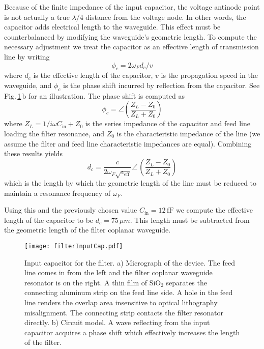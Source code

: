 Because of the finite impedance of the input capacitor, the voltage antinode point is not actually a true $\lambda/4$ distance from the voltage node.
In other words, the capacitor adds electrical length to the waveguide.
This effect must be counterbalanced by modifying the waveguide's geometric length.
To compute the necessary adjustment we treat the capacitor as an effective length of transmission line by writing \begin{equation}
\phi_c = 2 \omega_F d_c / v \end{equation}
where $d_c$ is the effective length of the capacitor, $v$ is the propagation speed in the waveguide, and $\phi_c$ is the phase shift incurred by reflection from the capacitor.
See Fig.\,\ref{Fig:filterInputCapacitance}\,b for an illustration.
The phase shift is computed as \cite{Pozar:microwaveEngineering2009} \begin{equation}
\phi_c = \angle \left( \frac{Z_L - Z_0}{Z_L + Z_0} \right) \end{equation}
where $Z_L = 1/i\omega C_{\text{in}} + Z_0$ is the series impedance of the capacitor and feed line loading the filter resonance, and $Z_0$ is the characteristic impedance of the line (we assume the filter and feed line characteristic impedances are equal).
Combining these results yields \begin{equation}
d_c = \frac{c}{2 \omega_F \sqrt{\epsilon_{\text{eff}}}} \angle \, \left( \frac{Z_L - Z_0}{Z_L + Z_0} \right) \label{eq:C_inElectricalLength} \end{equation}
which is the length by which the geometric length of the line must be reduced to maintain a resonance frequency of $\omega_F$.

Using this and the previously chosen value $C_{\text{in}}=12\,\text{fF}$ we compute the effective length of the capacitor to be $d_c = 75\,\mu m$.
This length must be subtracted from the geometric length of the filter coplanar waveguide.

\begin{figure}
\begin{centering}
\texttt{[image: filterInputCap.pdf]}
\par\end{centering}
\caption{Input capacitor for the filter. a) Micrograph of the device. The feed line comes in from the left and the filter coplanar waveguide resonator is on the right. A thin film of SiO$_2$ separates the connecting aluminum strip on the feed line side. A hole in the feed line renders the overlap area insensitive to optical lithography misalignment. The connecting strip contacts the filter resonator directly. b) Circuit model. A wave reflecting from the input capacitor acquires a phase shift which effectively increases the length of the filter.}
\label{Fig:filterInputCapacitance}
\end{figure}

